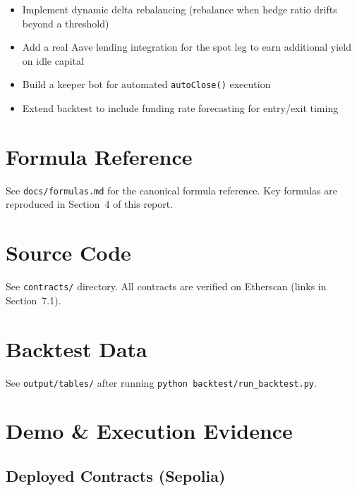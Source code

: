 \documentclass[11pt,a4paper]{article}
\begin{document}
\begin{itemize}
    \item Implement dynamic delta rebalancing (rebalance when hedge ratio drifts beyond a threshold)
    \item Add a real Aave lending integration for the spot leg to earn additional yield on idle capital
    \item Build a keeper bot for automated \texttt{autoClose()} execution
    \item Extend backtest to include funding rate forecasting for entry/exit timing
\end{itemize}

\appendix
\section{Formula Reference}

See \texttt{docs/formulas.md} for the canonical formula reference. Key formulas are reproduced in Section~4 of this report.

\section{Source Code}

See \texttt{contracts/} directory. All contracts are verified on Etherscan (links in Section~7.1).

\section{Backtest Data}

See \texttt{output/tables/} after running \texttt{python backtest/run\_backtest.py}.

\section{Demo \& Execution Evidence}

\subsection*{Deployed Contracts (Sepolia)}
\end{document}
